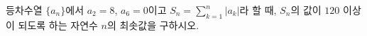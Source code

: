 \hspace*{2mm}\begin{minipage}[t]{\dimexpr\linewidth-2mm\relax}\vspace{0pt}
등차수열 $\{a_n\}$에서 $a_2=8$, $a_6=0$이고 $S_n=\displaystyle\sum_{k=1}^{n}|a_k|$라 할 때, $S_n$의 값이 $120$ 이상이 되도록 하는 자연수 $n$의 최솟값을 구하시오.\end{minipage}
